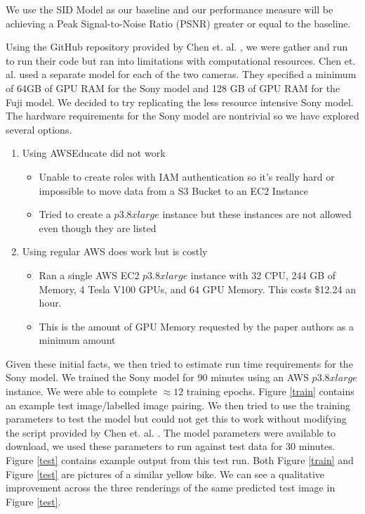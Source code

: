 \documentclass{article}
\begin{document}
We use the SID Model as our baseline and our performance measure will be achieving a Peak Signal-to-Noise Ratio (PSNR) greater or equal to the baseline.

Using the GitHub repository provided by Chen et. al. \cite{chen2018learning},
we were gather and run to run their code but ran into limitations with computational
resources. Chen et. al. \cite{chen2018learning} used a separate model for
each of the two cameras. They specified a minimum of 64GB of GPU RAM for the
Sony model and 128 GB of GPU RAM for the Fuji model. We decided to try
replicating the less resource intensive Sony model. The hardware
requirements for the Sony model are nontrivial so we have explored
several options.

\begin{enumerate}
\item Using AWSEducate did not work
  \begin{itemize}
    \item Unable to create roles with IAM authentication so it's really
	 hard or impossible to move data from a S3 Bucket to an EC2 Instance
    \item Tried to create a $p3.8xlarge$ instance but these instances are
      not allowed even though they are listed
  \end{itemize}
\item Using regular AWS does work but is costly
  \begin{itemize}
    \item Ran a single AWS EC2 $p3.8xlarge$ instance with 32 CPU, 244 GB of
	 Memory, 4 Tesla V100 GPUs, and 64 GPU Memory. This costs \$12.24
	 an hour.
    \item This is the amount of GPU Memory requested by the paper
      authors as a minimum amount
    \end{itemize}
\end{enumerate}

Given these initial facts, we then tried to estimate run time requirements
for the Sony model. We trained the Sony model for 90 minutes using an
AWS $p3.8xlarge$ instance. We were able to complete $\approx 12$ training
epochs. Figure \ref{train} contains an example test image/labelled image
pairing. We then tried to use the training parameters to
test the model but could not get this to work without modifying the script
provided by Chen et. al. \cite{chen2018learning}. The model parameters
were available to download, we used these parameters to run against test
data for 30 minutes. Figure \ref{test} contains example output from this
test run. Both Figure \ref{train} and Figure \ref{test}
are pictures of a similar yellow bike. We can see a qualitative improvement
across the three renderings of the same predicted test image in
Figure \ref{test}.
\end{document}
